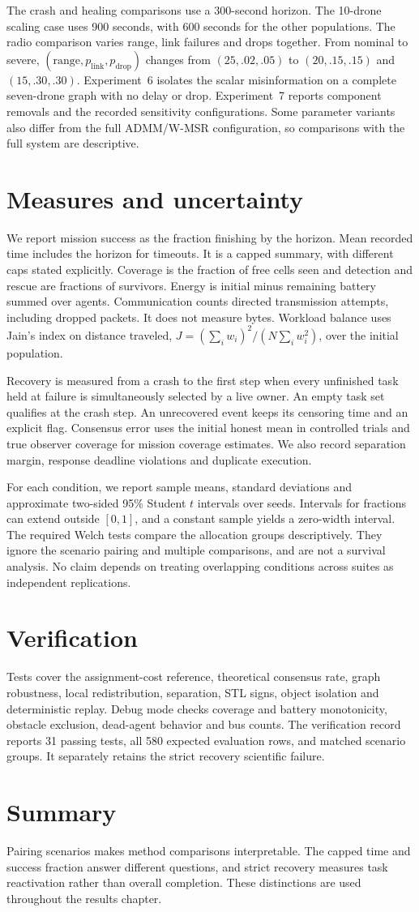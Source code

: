 The crash and healing comparisons use a 300-second horizon. The 10-drone scaling case uses 900 seconds, with 600 seconds for the other populations. The radio comparison varies range, link failures and drops together. From nominal to severe, $(\text{range}, p_{\mathrm{link}}, p_{\mathrm{drop}})$ changes from $(25,.02,.05)$ to $(20,.15,.15)$ and $(15,.30,.30)$. Experiment~6 isolates the scalar misinformation on a complete seven-drone graph with no delay or drop. Experiment~7 reports component removals and the recorded sensitivity configurations. Some parameter variants also differ from the full ADMM/W-MSR configuration, so comparisons with the full system are descriptive.

\section{Measures and uncertainty}
We report mission success as the fraction finishing by the horizon. Mean recorded time includes the horizon for timeouts. It is a capped summary, with different caps stated explicitly. Coverage is the fraction of free cells seen and detection and rescue are fractions of survivors. Energy is initial minus remaining battery summed over agents. Communication counts directed transmission attempts, including dropped packets. It does not measure bytes. Workload balance uses Jain's index on distance traveled, $J=(\sum_i w_i)^2/(N\sum_i w_i^2)$, over the initial population.

Recovery is measured from a crash to the first step when every unfinished task held at failure is simultaneously selected by a live owner. An empty task set qualifies at the crash step. An unrecovered event keeps its censoring time and an explicit flag. Consensus error uses the initial honest mean in controlled trials and true observer coverage for mission coverage estimates. We also record separation margin, response deadline violations and duplicate execution.

For each condition, we report sample means, standard deviations and approximate two-sided 95\% Student $t$ intervals over seeds. Intervals for fractions can extend outside $[0,1]$, and a constant sample yields a zero-width interval. The required Welch tests compare the allocation groups descriptively. They ignore the scenario pairing and multiple comparisons, and are not a survival analysis. No claim depends on treating overlapping conditions across suites as independent replications.

\section{Verification}
Tests cover the assignment-cost reference, theoretical consensus rate, graph robustness, local redistribution, separation, STL signs, object isolation and deterministic replay. Debug mode checks coverage and battery monotonicity, obstacle exclusion, dead-agent behavior and bus counts. The verification record reports 31 passing tests, all 580 expected evaluation rows, and matched scenario groups. It separately retains the strict recovery scientific failure.

\section{Summary}
Pairing scenarios makes method comparisons interpretable. The capped time and success fraction answer different questions, and strict recovery measures task reactivation rather than overall completion. These distinctions are used throughout the results chapter.
